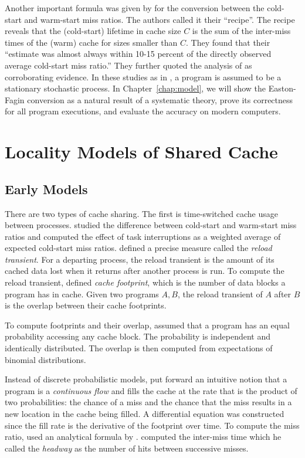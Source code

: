 Another important formula was given by \citet{EastonF:CACM78} for the
conversion between the cold-start and warm-start miss ratios.  The
authors called it their ``recipe''.  The recipe reveals that the
(cold-start) lifetime in cache size $C$ is the sum of the inter-miss
times of the (warm) cache for sizes smaller than $C$.  They found that
their ``estimate was almost always within 10-15 percent of the
directly observed average cold-start miss ratio.''  They further
quoted the analysis of \cite{ShedlerT:SIAMJC72} as corroborating
evidence.  In these studies as in \citet{DenningS:CACM72}, a program
is assumed to be a stationary stochastic process.  In
Chapter~\ref{chap:model}, we will show the Easton-Fagin conversion as
a natural result of a systematic theory, prove its correctness for all
program executions, and evaluate the accuracy on modern computers.

\section{Locality Models of Shared Cache}
\label{sec:locality:sharing}

\subsection{Early Models}

There are two types of cache sharing.  The first is time-switched
cache usage between processes.  \citet{EastonF:CACM78} studied the
difference between cold-start and warm-start miss ratios and computed
the effect of task interruptions as a weighted average of expected
cold-start miss ratios.  \citet{ThiebautS:TOCS87} defined a precise
measure called the \emph{reload transient}.  For a departing process,
the reload transient is the amount of its cached data lost when it
returns after another process is run.  To compute the reload
transient, \citet{ThiebautS:TOCS87} defined \emph{cache footprint},
which is the number of data blocks a program has in cache.  Given two
programs $A,B$, the reload transient of $A$ after $B$ is the overlap
between their cache footprints.

To compute footprints and their overlap, \citet{ThiebautS:TOCS87}
assumed that a program has an equal probability accessing any cache
block.  The probability is independent and identically distributed.
The overlap is then computed from expectations of binomial
distributions.

Instead of discrete probabilistic models, \citet{Strecker:TOCS83} put
forward an intuitive notion that a program is a \emph{continuous flow}
and fills the cache at the rate that is the product of two
probabilities: the chance of a miss and the chance that the miss
results in a new location in the cache being filled.  
A differential equation was constructed since the fill rate
is the derivative of the footprint over time.  To compute
the miss ratio, \citet{Strecker:TOCS83} used an analytical formula by
\citet{Saltzer:CACM74}.  \citet{Saltzer:CACM74} computed the inter-miss
time which he called the \emph{headway} as the number of hits between successive
misses.

